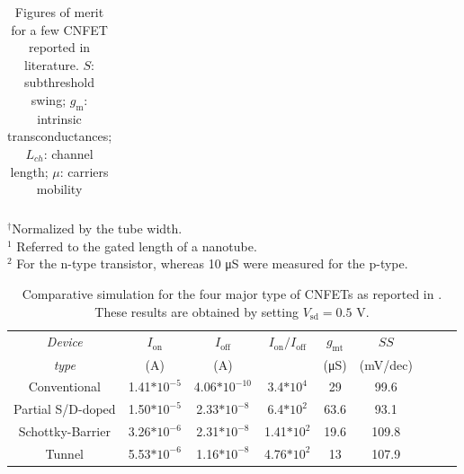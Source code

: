 \begin{table}[]
\begin{tabular}{ccccccccc}
    \bottomrule
    \end{tabular}
    \caption{\label{tab:CNFET} Figures of merit for a few CNFET reported in literature. $S$: subthreshold swing; $g_\text{m}$: intrinsic transconductances; $L_{ch}$: channel length; $\mu$: carriers mobility}
    
    \begin{tabbing}
    $^\dag$Normalized by the tube width.\\
    $^{\mathrm{1}}$ Referred to the gated length of a nanotube. \\
    $^{\mathrm{2}}$ For the n-type transistor, whereas 10 \si{\micro\siemens} were measured for the p-type. \\
    
    \end{tabbing}
    
    \end{table}
    
    
    
    \begin{table}[]
    
    \centering
    \small
    \begin{tabular}{ccccccccc}
    \toprule
    
    \textit{Device} & $I_\text{on}$ & $I_\text{off}$ & $I_\text{on}/I_\text{off}$ & $g_\text{mt}$ & $SS$ & \\
    \textit{type} & (A) & (A) &  & (\si{\micro\siemens}) & (mV/dec) &  \\
    \midrule
    Conventional       & 1.41$*10^{-5}$ & 4.06$*10^{-10}$ & 3.4$*10^{4}$  & 29    & 99.6   \\
    \midrule
    Partial S/D-doped  & 1.50$*10^{-5}$ & 2.33$*10^{-8}$  & 6.4$*10^{2}$  & 63.6  & 93.1   \\
    \midrule
    Schottky-Barrier   & 3.26$*10^{-6}$ & 2.31$*10^{-8}$  & 1.41$*10^{2}$ & 19.6  & 109.8   \\
    \midrule
    Tunnel             & 5.53$*10^{-6}$ & 1.16$*10^{-8}$  & 4.76$*10^{2}$ & 13    & 107.9    \\
    
    \bottomrule
    \end{tabular}
    \caption{Comparative simulation for the four major type of CNFETs as reported in \cite{singh2015comparative}. These results are obtained by setting $V_\text{sd} = 0.5$ V.}
    
    \end{table}
    \newpage



